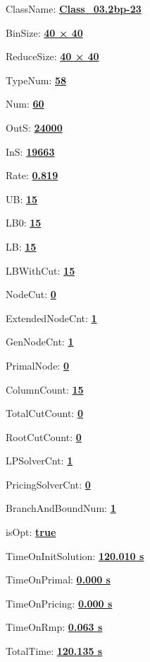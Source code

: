 \documentclass[11pt]{article}
\begin{document}
\pagestyle{empty}


ClassName: \underline{\textbf{Class_03.2bp-23}}
\par
BinSize: \underline{\textbf{40 × 40}}
\par
ReduceSize: \underline{\textbf{40 × 40}}
\par
TypeNum: \underline{\textbf{58}}
\par
Num: \underline{\textbf{60}}
\par
OutS: \underline{\textbf{24000}}
\par
InS: \underline{\textbf{19663}}
\par
Rate: \underline{\textbf{0.819}}
\par
UB: \underline{\textbf{15}}
\par
LB0: \underline{\textbf{15}}
\par
LB: \underline{\textbf{15}}
\par
LBWithCut: \underline{\textbf{15}}
\par
NodeCut: \underline{\textbf{0}}
\par
ExtendedNodeCnt: \underline{\textbf{1}}
\par
GenNodeCnt: \underline{\textbf{1}}
\par
PrimalNode: \underline{\textbf{0}}
\par
ColumnCount: \underline{\textbf{15}}
\par
TotalCutCount: \underline{\textbf{0}}
\par
RootCutCount: \underline{\textbf{0}}
\par
LPSolverCnt: \underline{\textbf{1}}
\par
PricingSolverCnt: \underline{\textbf{0}}
\par
BranchAndBoundNum: \underline{\textbf{1}}
\par
isOpt: \underline{\textbf{true}}
\par
TimeOnInitSolution: \underline{\textbf{120.010 s}}
\par
TimeOnPrimal: \underline{\textbf{0.000 s}}
\par
TimeOnPricing: \underline{\textbf{0.000 s}}
\par
TimeOnRmp: \underline{\textbf{0.063 s}}
\par
TotalTime: \underline{\textbf{120.135 s}}
\par
\newpage


\end{document}
